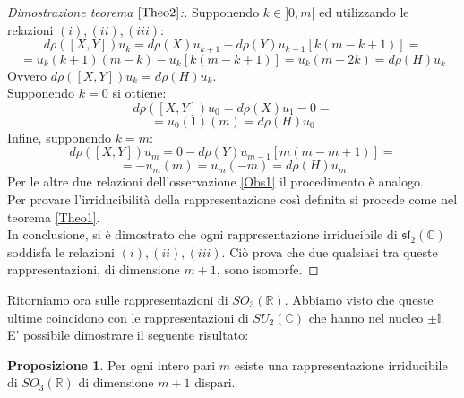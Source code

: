 \documentclass[12pt,a4paper]{report}
\theoremstyle{definition}
\theoremstyle{Theorem}
\newtheorem{Prop}[Def]{Proposizione}
\theoremstyle{definition}
\theoremstyle{definition}
\theoremstyle{definition}
\begin{document}
\begin{proof}[Dimostrazione teorema $\ref{Theo2}$:]
Supponendo $k\in ]0,m[$ ed utilizzando le relazioni $(i),(ii),(iii)$:
$$d\rho([X,Y])u_k=d\rho(X)u_{k+1}-d\rho(Y)u_{k-1}[k(m-k+1)]=$$
$$=u_k(k+1)(m-k)-u_k[k(m-k+1)]=u_k(m-2k)=d\rho(H)u_k$$
Ovvero $d\rho([X,Y])u_k=d\rho(H)u_k$.\\
Supponendo $k=0$ si ottiene: $$d\rho([X,Y])u_0=d\rho(X)u_{1}-0=$$
$$=u_0(1)(m)=d\rho(H)u_0$$
Infine, supponendo $k=m$:
$$d\rho([X,Y])u_m=0-d\rho(Y)u_{m-1}[m(m-m+1)]=$$
$$=-u_m(m)=u_m(-m)=d\rho(H)u_m$$
Per le altre due relazioni dell'osservazione \ref{Obs1} il procedimento è analogo.\\
Per provare l'irriducibilità della rappresentazione così definita si procede come nel teorema \ref{Theo1}.\\
In conclusione, si è dimostrato che ogni rappresentazione irriducibile di $\mathfrak{sl_2(\mathbb{C})}$ soddisfa le relazioni $(i),(ii),(iii)$. Ciò prova che due qualsiasi tra queste rappresentazioni, di dimensione $m+1$, sono isomorfe.
\end{proof}
\begin{comment}
Si procede ora alla dimostrazione del Lemma \ref{Lemma2}.
\begin{proof}
	La strategia di dimostrazione sarà quella di utilizzare l'induzione.
	Vogliamo dimostrare che, per $k\geq 1$:
	\begin{equation}
		\label{eq:4}
		d\rho(X)u_k=k[\lambda-(k-1)]u_{k-1} 
\tag{i}
\end{equation}
	Sia allora $k=1$. Sapendo che $d\rho([X,Y])=d\rho(H)=d\rho(X)d\rho(Y)-d\rho(Y)d\rho(X)$ e che $d\rho(Y)u_k=u_{k+1}$, $d\rho(H)u_k=(\lambda-2k)u_k$ e $d\rho(X)u_0=0$, verifichiamo $(i)$ per $k=1$.
	$$d\rho(X)u_1=d\rho(X)d\rho(Y)u_0=d\rho(H)u_0+d\rho(Y)d\rho(X)u_0=$$$$=d\rho(H)u_0+0=(\lambda-0)u_0=\lambda u_0$$
	Dato che la relazione $(i)$ è verificata per $k=1$, supponiamo che lo sia anche per un generico $k$ e dimostriamo che in quel caso è vera anche per $k+1$:
	$$\rho(X)u_{k+1}=d\rho(X)d\rho(Y)u_{k}=d\rho(H)u_k+d\rho(Y)d\rho(X)u_k=$$
	$$=(\lambda-2k)u_k+d\rho(Y)k[\lambda-(k-1)]u_{k-1}=$$ 
	$$=(\lambda-2k)u_k+k[\lambda-(k-1)]u_{k}=(\lambda-2k+k\lambda-k^2+k)u_k=$$
	$$=(\lambda-k)(k+1)u_k$$
	Questo completa la dimostrazione.
\end{proof}
\end{comment}
Ritorniamo ora sulle rappresentazioni di $SO_3(\mathbb{R})$. Abbiamo visto che queste ultime coincidono con le rappresentazioni di $SU_2(\mathbb{C})$ che hanno nel nucleo $\pm\mathbb{I}$. E' possibile dimostrare il seguente risultato:
\begin{Prop}
	Per ogni intero pari $m$ esiste una rappresentazione irriducibile di $SO_3(\mathbb{R})$ di dimensione $m+1$ dispari.
\end{Prop}
\end{document}
